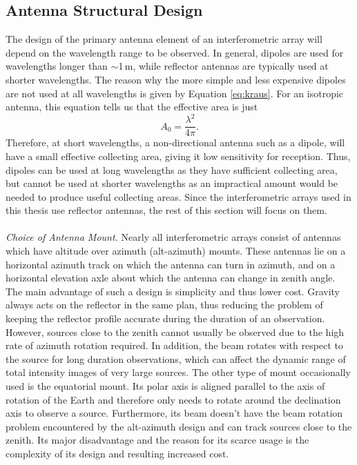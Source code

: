 \subsection{Antenna Structural Design}\label{subsec:2.1.2}
The design of the primary antenna element of an interferometric array will depend on the wavelength range to be observed. In general, dipoles are used for wavelengths longer than $\sim$1\,m, while reflector antennas are typically used at shorter wavelengths. The reason why the more simple and less expensive dipoles are not used at all wavelengths is given by Equation \ref{eq:kraus}. For an isotropic antenna, this equation tells us that the effective area is just
\begin{equation}
A_{0} = \frac{\lambda ^2}{4\pi}.
\end{equation}
Therefore, at short wavelengths, a non-directional antenna such as a dipole, will have a small effective collecting area, giving it low sensitivity for reception. Thus, dipoles can be used at long wavelengths as they have sufficient collecting area, but cannot be used at shorter wavelengths as an impractical amount would be needed to produce useful collecting areas. Since the interferometric arrays used in this thesis use reflector antennas, the rest of this section will focus on them.\\
\\
\textit{Choice of Antenna Mount.} Nearly all interferometric arrays consist of antennas which have altitude over azimuth (alt-azimuth) mounts. These antennas lie on a horizontal azimuth track on which the antenna can turn in azimuth, and on a horizontal elevation axle about which the antenna can change in zenith angle. The main advantage of such a design is simplicity and thus lower cost. Gravity always acts on the reflector in the same plan, thus reducing the problem of keeping the reflector profile accurate during the duration of an observation. However, sources close to the zenith cannot usually be observed due to the high rate of azimuth rotation required. In addition, the beam rotates with respect to the source for long duration observations, which can affect the dynamic range of total intensity images of very large sources. The other type of mount occasionally used is the equatorial mount. Its polar axis is aligned parallel to the axis of rotation of the Earth and therefore only needs to rotate around the declination axis to observe a source. Furthermore, its beam doesn't have the beam rotation problem encountered by the alt-azimuth design and can track sources close to the zenith. Its major disadvantage and the reason for its scarce usage is the complexity of its design and resulting increased cost. \\
